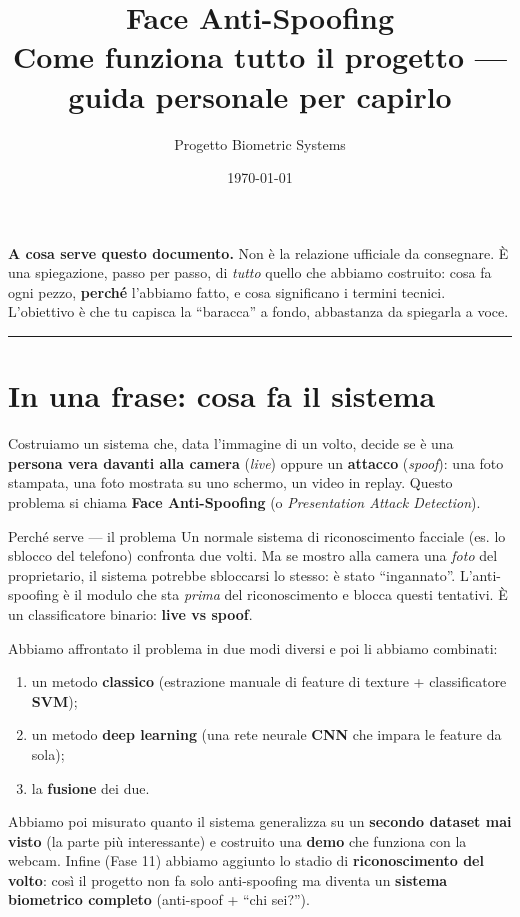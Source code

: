 \documentclass[11pt,a4paper]{article}
\title{\vspace{-1.5cm}\textbf{Face Anti-Spoofing}\\[4pt]
\large Come funziona tutto il progetto --- guida personale per capirlo}
\author{Progetto Biometric Systems}
\date{\today}
\newcommand{\acr}[1]{\textbf{#1}}
\newcommand{\say}[1]{``#1''}
\begin{document}
\maketitle
\thispagestyle{fancy}

\begin{tcolorbox}[colback=perchebg,colframe=perche,boxrule=0.4pt]
\textbf{A cosa serve questo documento.} Non \`e la relazione ufficiale da consegnare.
\`E una spiegazione, passo per passo, di \emph{tutto} quello che abbiamo costruito: cosa fa
ogni pezzo, \textbf{perch\'e} l'abbiamo fatto, e cosa significano i termini tecnici. L'obiettivo
\`e che tu capisca la \say{baracca} a fondo, abbastanza da spiegarla a voce.
\end{tcolorbox}

\tableofcontents
\vspace{0.4cm}
\hrule

\section{In una frase: cosa fa il sistema}
Costruiamo un sistema che, data l'immagine di un volto, decide se \`e una \textbf{persona vera
davanti alla camera} (\emph{live}) oppure un \textbf{attacco} (\emph{spoof}): una foto stampata,
una foto mostrata su uno schermo, un video in replay. Questo problema si chiama
\textbf{Face Anti-Spoofing} (o \emph{Presentation Attack Detection}).

\begin{terminebox}{Perch\'e serve --- il problema}
Un normale sistema di riconoscimento facciale (es. lo sblocco del telefono) confronta due volti.
Ma se mostro alla camera una \emph{foto} del proprietario, il sistema potrebbe sbloccarsi lo
stesso: \`e stato \say{ingannato}. L'anti-spoofing \`e il modulo che sta \emph{prima} del
riconoscimento e blocca questi tentativi. \`E un classificatore binario: \textbf{live vs spoof}.
\end{terminebox}

Abbiamo affrontato il problema in due modi diversi e poi li abbiamo combinati:
\begin{enumerate}
  \item un metodo \textbf{classico} (estrazione manuale di feature di texture + classificatore \acr{SVM});
  \item un metodo \textbf{deep learning} (una rete neurale \acr{CNN} che impara le feature da sola);
  \item la \textbf{fusione} dei due.
\end{enumerate}
Abbiamo poi misurato quanto il sistema generalizza su un \textbf{secondo dataset mai visto}
(la parte pi\`u interessante) e costruito una \textbf{demo} che funziona con la webcam. Infine
(Fase 11) abbiamo aggiunto lo stadio di \textbf{riconoscimento del volto}: cos\`i il progetto non
fa solo anti-spoofing ma diventa un \textbf{sistema biometrico completo} (anti-spoof + \say{chi sei?}).
\end{document}
